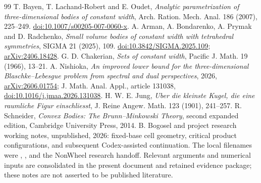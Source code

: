 \documentclass[11pt]{article}
\theoremstyle{remark}\newtheorem{remark}[theorem]{Remark}
\begin{document}
\begin{thebibliography}{99}
 T. Bayen, T. Lachand-Robert and E. Oudet, \emph{Analytic parametrization of three-dimensional bodies of constant width}, Arch. Ration. Mech. Anal. 186 (2007), 225--249. \href{https://doi.org/10.1007/s00205-007-0060-x}{doi:10.1007/s00205-007-0060-x}.
 A. Arman, A. Bondarenko, A. Prymak and D. Radchenko, \emph{Small volume bodies of constant width with tetrahedral symmetries}, SIGMA 21 (2025), 109. \href{https://doi.org/10.3842/SIGMA.2025.109}{doi:10.3842/SIGMA.2025.109}; \href{https://arxiv.org/abs/2406.18428}{arXiv:2406.18428}.
 G. D. Chakerian, \emph{Sets of constant width}, Pacific J. Math. 19 (1966), 13--21.
 A. Nishioka, \emph{An improved lower bound for the three-dimensional Blaschke--Lebesgue problem from spectral and dual perspectives}, 2026, \href{https://arxiv.org/abs/2606.01754}{arXiv:2606.01754}; J. Math. Anal. Appl., article 131038, \href{https://doi.org/10.1016/j.jmaa.2026.131038}{doi:10.1016/j.jmaa.2026.131038}.
 H. W. E. Jung, \emph{Uber die kleinste Kugel, die eine raumliche Figur einschliesst}, J. Reine Angew. Math. 123 (1901), 241--257.
 R. Schneider, \emph{Convex Bodies: The Brunn--Minkowski Theory}, second expanded edition, Cambridge University Press, 2014.
 B. Bogosel and project research working notes, unpublished, 2026: fixed-base cell geometry, critical product configurations, and subsequent Codex-assisted continuation. The local filenames were , , and the NonWheel research handoff. Relevant arguments and numerical inputs are consolidated in the present document and retained evidence package; these notes are not asserted to be published literature.
\end{thebibliography}
\end{document}
